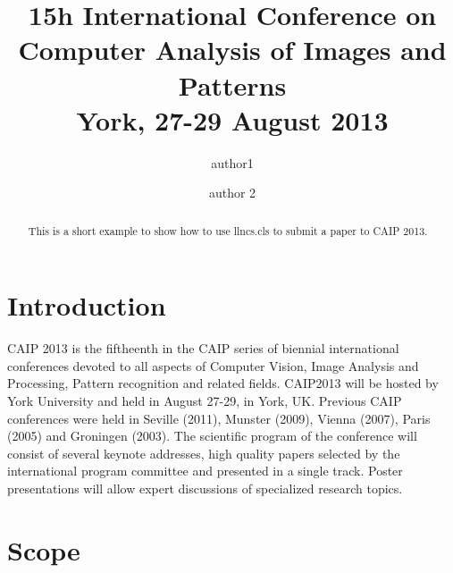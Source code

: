 \documentclass{llncs}
\begin{document}
\title{ 15h International Conference on Computer Analysis of Images and Patterns\\
York, 27-29 August 2013}

%
\author{author1 \and author 2}
%
%
%

\maketitle              %

\begin{abstract}
This is a short example to show how to use llncs.cls to submit a paper to CAIP 2013.
\end{abstract}
%
\section{Introduction}
%
CAIP 2013 is the fiftheenth in the CAIP series of biennial international conferences devoted to all aspects of Computer Vision, Image Analysis and Processing, Pattern recognition and related fields. CAIP2013 will be hosted by York University and held in August 27-29,  in York, UK. Previous CAIP conferences were held in Seville (2011), Munster (2009), Vienna (2007), Paris (2005) and Groningen (2003). The scientific program of the conference will consist of several keynote addresses, high quality papers selected by the international program committee and presented in a single track. Poster presentations will allow expert discussions of specialized research topics. 
%
\section{Scope}
\end{document}
